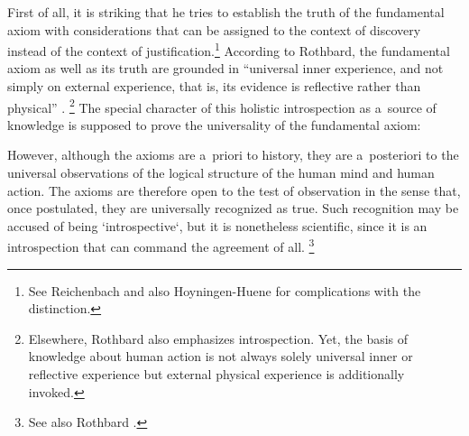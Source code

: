 First of all, it is striking that he tries to establish the truth of the fundamental axiom with considerations that can be assigned to the context of discovery instead of the context of justification.\footnote{See Reichenbach 
\parencite*[][]{reichenbach_experience_1938} %
 and also Hoyningen-Huene 
\parencite*[][]{hoyningen-huene_context_1987} %
 for complications with the distinction.} According to Rothbard, the fundamental axiom as well as its truth are grounded in ``universal inner experience, and not simply on external experience, that is, its evidence is reflective rather than physical'' 
\parencite[][p.318]{rothbard_defense_1957}.%
\footnote{Elsewhere, Rothbard 
\parencite*[][pp.33–34]{rothbard_praxeology_2011} %
 also emphasizes introspection. Yet, the basis of knowledge about human action is not always solely universal inner or reflective experience but external physical experience is additionally invoked.} The special character of this holistic introspection as a~source of knowledge is supposed to prove the universality of the fundamental axiom:



However, although the axioms are a~priori to history, they are a~posteriori to the universal observations of the logical structure of the human mind and human action. The axioms are therefore open to the test of observation in the sense that, once postulated, they are universally recognized as true. Such recognition may be accused of being ‘introspective‘, but it is nonetheless scientific, since it is an introspection that can command the agreement of all. 
\parencite[][p.181]{rothbard_mises_1951}%
\footnote{See also Rothbard 
\parencite*[][pp.317–318]{rothbard_defense_1957}.%
}



